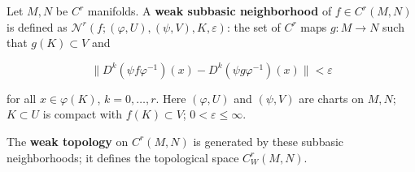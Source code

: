 Let $M, N$ be $C^r$ manifolds. A \textbf{weak subbasic neighborhood} of $f \in C^r(M,N)$ is defined as $\mathcal{N}^r(f; (\varphi, U), (\psi, V), K, \varepsilon)$: the set of $C^r$ maps $g: M \to N$ such that $g(K) \subset V$ and

$$\| D^k(\psi f \varphi^{-1})(x) - D^k(\psi g \varphi^{-1})(x) \| < \varepsilon$$

for all $x \in \varphi(K)$, $k = 0, \ldots, r$. Here $(\varphi, U)$ and $(\psi, V)$ are charts on $M, N$; $K \subset U$ is compact with $f(K) \subset V$; $0 < \varepsilon \leqslant \infty$.

The \textbf{weak topology} on $C^r(M, N)$ is generated by these subbasic neighborhoods; it defines the topological space $C^r_W(M, N)$.

